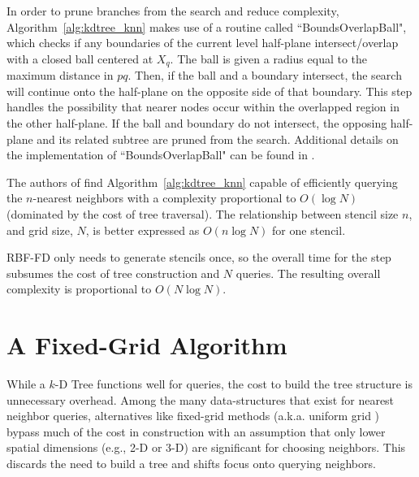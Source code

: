 \documentclass{report}
\begin{document}
In order to prune branches from the search and reduce complexity, Algorithm~\ref{alg:kdtree_knn} makes use of a routine called ``BoundsOverlapBall", which checks if any boundaries of the current level half-plane intersect/overlap with a closed ball centered at $X_q$. The ball is given a radius equal to the maximum distance in $pq$. Then, if the ball and a boundary intersect, the search will continue onto the half-plane on the opposite side of that boundary. This step handles the possibility that nearer nodes occur within the overlapped region in the other half-plane. If the ball and boundary do not intersect, the opposing half-plane and its related subtree are pruned from the search. Additional details on the implementation of ``BoundsOverlapBall" can be found in \cite{Friedman1977,TagliasacchiGC}. 

The authors of \cite{Friedman1977} find Algorithm~\ref{alg:kdtree_knn} capable of efficiently querying the $n$-nearest neighbors with a complexity proportional to $O(\log{N})$ (dominated by the cost of tree traversal). The relationship between stencil size $n$, and grid size, $N$, is better expressed as $O(n \log{N})$ for one stencil. 

RBF-FD only needs to generate stencils once, so the overall time for the step subsumes the cost of tree construction and $N$ queries. The resulting overall complexity is proportional to $O(N\log{N})$. %





\section{A Fixed-Grid Algorithm}

While a $k$-D Tree functions well for queries, the cost to build the tree structure is unnecessary overhead. Among the many data-structures that exist for nearest neighbor queries, alternatives like fixed-grid methods \cite{Samet2005,Wendland2002,WendlandBook} (a.k.a. uniform grid \cite{Krog2010,Green2010}) bypass much of the cost in construction with an assumption that only lower spatial dimensions (e.g., 2-D or 3-D) are significant for choosing neighbors. This discards the need to build a tree and shifts focus onto querying neighbors. 
\end{document}
